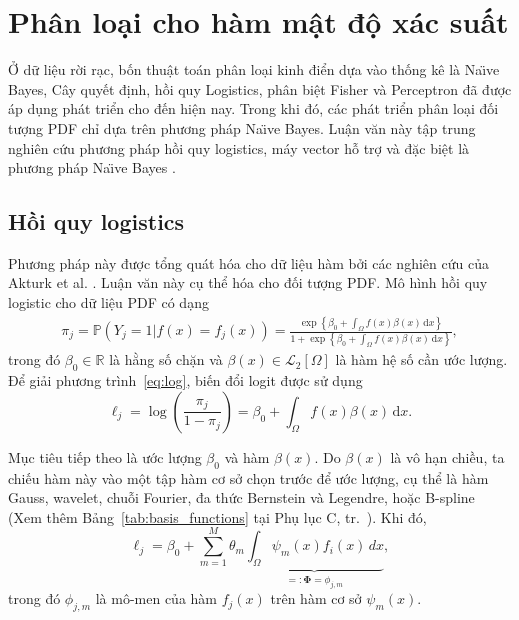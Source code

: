 \documentclass[a4paper,oneside]{book} %
\theoremstyle{plain}
\theoremstyle{plain}
\theoremstyle{nonumberplain}
\begin{document}
\section{Phân loại cho hàm mật độ xác suất}
Ở dữ liệu rời rạc, bốn thuật toán phân loại kinh điển dựa vào thống kê là Na\"{\i}ve Bayes, Cây quyết định, hồi quy Logistics, phân biệt Fisher \cite{fisher1936use} và Perceptron \cite{rosenblatt1961principles} đã được áp dụng phát triển cho đến hiện nay. Trong khi đó, các phát triển phân loại đối tượng PDF chỉ dựa trên phương pháp Na\"{\i}ve Bayes. Luận văn này tập trung nghiên cứu phương pháp hồi quy logistics, máy vector hỗ trợ và đặc biệt là phương pháp Na\"{\i}ve Bayes \cite{huynh2024classifying,vo2024supervised}. 
\subsection{Hồi quy logistics}

Phương pháp này được tổng quát hóa cho dữ liệu hàm bởi các nghiên cứu của Akturk et al. \cite{akturk2024robust}. Luận văn này cụ thể hóa cho đối tượng PDF. Mô hình hồi quy logistic cho dữ liệu PDF có dạng
\begin{align}\label{eq:log} \pi _j = {\mathbb {P}}(Y_j = 1 \vert f(x) = f_j(x)) =  \frac{\exp \left\{ \beta _0 + \int _{\Omega} f(x) \beta (x) \mathrm{\,d}x \right\} }{1 + \exp \left\{ \beta _0 + \int _{\Omega} f(x) \beta (x) \mathrm{\,d}x \right\} }, \end{align}
trong đó $\beta_0\in \mathbb{R}$ là hằng số chặn và $\beta(x) \in\mathcal{L}_2[\Omega]$ là hàm hệ số cần ước lượng. Để giải phương trình~\eqref{eq:log}, biến đổi logit được sử dụng
$$
\ell_j = \log\left(\frac{\pi_j}{1-\pi_j}\right) = \beta_0 + \int _{\Omega} f(x) \beta (x) \mathrm{\,d}x.
$$


Mục tiêu tiếp theo là ước lượng $\beta_0$ và hàm $\beta(x)$. Do $\beta(x)$ là vô hạn chiều, ta chiếu hàm này vào một tập hàm cơ sở chọn trước để ước lượng, cụ thể là hàm Gauss, wavelet, chuỗi Fourier, đa thức Bernstein và Legendre, hoặc B-spline (Xem thêm Bảng~\ref{tab:basis_functions} tại Phụ lục C, tr.~\pageref{phulucC}). Khi đó,
$$
\ell_j = \beta_0 + \sum_{m=1}^M \theta_m \underbrace{\int_\Omega \psi_m(x) f_i(x)\, dx}_{=: \bm\Phi=\phi_{j,m}},
$$
trong đó $\phi_{j,m}$ là mô-men của hàm $f_j(x)$ trên hàm cơ sở $\psi_m(x)$. 
\end{document}
